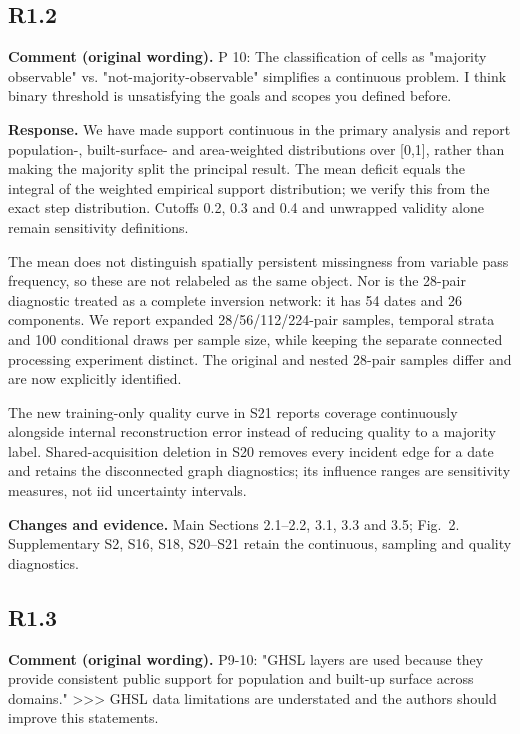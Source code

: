\documentclass[11pt,a4paper]{article}
\begin{document}
\subsection*{R1.2}

\textbf{Comment (original wording).} P 10: The classification of cells as "majority observable" vs. "not-majority-observable" simplifies a continuous problem. I think binary threshold is unsatisfying the goals and scopes you defined before.

\textbf{Response.} We have made support continuous in the primary analysis and report population-, built-surface- and area-weighted distributions over [0,1], rather than making the majority split the principal result. The mean deficit equals the integral of the weighted empirical support distribution; we verify this from the exact step distribution. Cutoffs 0.2, 0.3 and 0.4 and unwrapped validity alone remain sensitivity definitions.

The mean does not distinguish spatially persistent missingness from variable pass frequency, so these are not relabeled as the same object. Nor is the 28-pair diagnostic treated as a complete inversion network: it has 54 dates and 26 components. We report expanded 28/56/112/224-pair samples, temporal strata and 100 conditional draws per sample size, while keeping the separate connected processing experiment distinct. The original and nested 28-pair samples differ and are now explicitly identified.

The new training-only quality curve in S21 reports coverage continuously alongside internal reconstruction error instead of reducing quality to a majority label. Shared-acquisition deletion in S20 removes every incident edge for a date and retains the disconnected graph diagnostics; its influence ranges are sensitivity measures, not iid uncertainty intervals.

\textbf{Changes and evidence.} Main Sections 2.1--2.2, 3.1, 3.3 and 3.5; Fig.~2. Supplementary S2, S16, S18, S20--S21 retain the continuous, sampling and quality diagnostics.

\subsection*{R1.3}

\textbf{Comment (original wording).} P9-10: "GHSL layers are used because they provide consistent public support for population and built-up surface across domains." >>> GHSL data limitations are understated and the authors should improve this statements.
\end{document}
